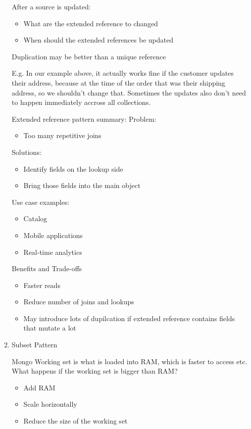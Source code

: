\documentclass[11pt]{article}
\begin{document}
\begin{enumerate}
After a source is updated:
\begin{itemize}
\item What are the extended reference to changed
\item When should the extended references be updated
\end{itemize}

Duplication may be better than a unique reference

E.g. In our example above, it actually works fine if the customer updates their address, because at the time of the order that was their shipping address, so we shouldn't change that.
Sometimes the updates also don't need to happen immediately accross all collections.

Extended reference pattern summary:
Problem:
\begin{itemize}
\item Too many repetitive joins
\end{itemize}
Solutions:
\begin{itemize}
\item Identify fields on the lookup side
\item Bring those fields into the main object
\end{itemize}
Use case examples:
\begin{itemize}
\item Catalog
\item Mobile applications
\item Real-time analytics
\end{itemize}

Benefits and Trade-offs
\begin{itemize}
\item Faster reads
\item Reduce number of joins and lookups
\item May introduce lots of dupilcation if extended reference contains fields that mutate a lot
\end{itemize}

\item Subset Pattern
\label{sec:org3fb8bfa}

Mongo Working set is what is loaded into RAM, which is faster to access etc. What happens if the working set is bigger than RAM?
\begin{itemize}
\item Add RAM
\item Scale horizontally
\item Reduce the size of the working set
\end{itemize}


\end{enumerate}
\end{document}
